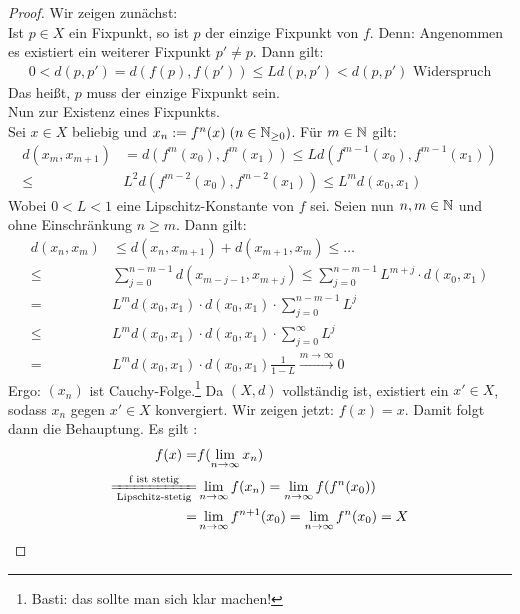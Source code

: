 \begin{proof}
	Wir zeigen zunächst: \\
	Ist $p \in X$ ein Fixpunkt, so ist $p$ der einzige Fixpunkt von $f$. 
	Denn: Angenommen es existiert ein weiterer Fixpunkt $p' \neq p$. Dann gilt:
	\begin{align*}
		0 < d(p,p')=d(f(p),f(p')) \leq L d(p,p') < d(p,p') \text{ Widerspruch}
	\end{align*}
	Das heißt, $p$ muss der einzige Fixpunkt sein. \\
	Nun zur Existenz eines Fixpunkts.\\
	Sei $x \in X$ beliebig und $x_n := f^n(x) \; (n \in \mathbb{N}_{\geq 0})$. 
	Für $m \in \mathbb{N}$ gilt:
	\begin{align*}
		d(x_m, x_{m+1})&= d(f^m(x_0),f^m(x_1)) \leq L d(f^{m-1}(x_0),f^{m-1}(x_1))\\
		\leq & L^2 d(f^{m-2}(x_0), f^{m-2}(x_1)) \leq L^m d(x_0,x_1)
	\end{align*}
	Wobei $0 < L < 1$ eine Lipschitz-Konstante von $f$ sei.
	Seien nun $n, m \in \mathbb{N}$ und ohne Einschränkung $n \geq m$. Dann gilt:
	\begin{align*}
	d(x_n,x_m) & \leq d(x_n,x_{m+1})+d(x_{m+1},x_m) \leq \hdots \\
	\leq & \sum_{j = 0}^{n-m-1} d(x_{m-j-1},x_{m+j}) 
	\leq \sum_{j=0}^{n-m-1} L^{m+j}\cdot d(x_0,x_1) \\ 
	= & L^m d(x_0,x_1) \cdot d(x_0,x_1) \cdot \sum_{j=0}^{n-m-1}  L^j \\
	\leq & L^m d(x_0,x_1) \cdot d(x_0,x_1) \cdot \sum_{j=0}^\infty L^j \\
	= & L^m d(x_0,x_1) \cdot d(x_0,x_1) \frac{1}{1-L}
	\xrightarrow{m \rightarrow \infty} 0
	\end{align*}
	Ergo: $(x_n)$ ist Cauchy-Folge.\footnote{Basti: das sollte man sich klar machen!} Da $(X,d)$ vollständig ist, existiert ein $x'\in X$, sodass $x_n$ 
	gegen $x' \in X$ konvergiert. Wir zeigen jetzt: $f(x) =x$.
	Damit folgt dann die Behauptung. Es gilt : 
	\begin{align*}
		f(x) = & f(\lim\limits_{n \rightarrow \infty}{x_n}) \\ \xlongequal[\text{Lipschitz-stetig}]{\text{f ist stetig}} & \lim\limits_{n \rightarrow \infty}{f(x_n)} = \lim\limits_{n\rightarrow \infty}{f(f^n(x_0))} \\
		 = & \lim\limits_{n \rightarrow \infty}{f^{n+1}(x_0)}
		= \lim\limits_{n \rightarrow \infty}{f^n(x_0)} = X
	\end{align*}			
\end{proof}